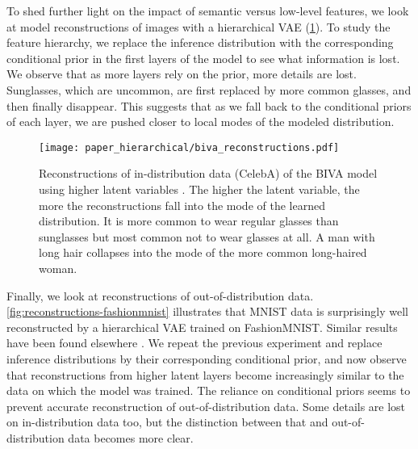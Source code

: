 To shed further light on the impact of semantic versus low-level features, we look at model reconstructions of images with a hierarchical VAE (\cref{fig:biva-reconstructions-celeba}).
To study the feature hierarchy, we replace the inference distribution with the corresponding conditional prior in the first layers of the model to see what information is lost.
We observe that as more layers rely on the prior, more details are lost.
Sunglasses, which are uncommon, are first replaced by more common glasses, and then finally disappear.
This suggests that as we fall back to the conditional priors of each layer, we are pushed closer to local modes of the modeled distribution.

\begin{figure}[t]
    \centering
    \texttt{[image: paper\_hierarchical/biva\_reconstructions.pdf]}
    \vspace{0mm}
    \caption[Reconstructions of in-distribution data (CelebA) of the BIVA model using higher latent variables]{Reconstructions of in-distribution data (CelebA) of the BIVA model using higher latent variables  \cite{maaloe_biva_2019}.
    The higher the latent variable, the more the reconstructions fall into the mode of the learned distribution.
    It is more common to wear regular glasses than sunglasses but most common not to wear glasses at all.
    A man with long hair collapses into the mode of the more common long-haired woman.}
    \vspace{0mm}
    \label{fig:biva-reconstructions-celeba}
\end{figure}
Finally, we look at reconstructions of out-of-distribution data.
\cref{fig:reconstructions-fashionmnist} illustrates that MNIST data is surprisingly well reconstructed by a hierarchical VAE trained on FashionMNIST.
Similar results have been found elsewhere \cite{xiao_likelihood_2020}.
We repeat the previous experiment and replace inference distributions by their corresponding conditional prior, and now observe that reconstructions from higher latent layers become increasingly similar to the data on which the model was trained.
The reliance on conditional priors seems to prevent accurate reconstruction of out-of-distribution data.
Some details are lost on in-distribution data too, but the distinction between that and out-of-distribution data becomes more clear.

